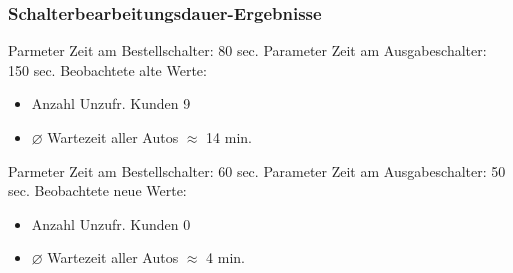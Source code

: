 \documentclass{beamer}
\begin{document}
\begin{frame}

\frametitle{Schalterbearbeitungsdauer-Ergebnisse}
	
	
	Parmeter Zeit am Bestellschalter: 80 sec. \newline
	Parameter Zeit am Ausgabeschalter: 150 sec. \newline
	Beobachtete alte Werte:\newline
	
  	\begin{itemize}
  		\item Anzahl Unzufr. Kunden 9
  		\item $\diameter$ Wartezeit aller Autos $\approx$ 14 min.
  	
  	\end{itemize}

	
	Parmeter Zeit am Bestellschalter: 60 sec. \newline
	Parameter Zeit am Ausgabeschalter: 50 sec. \newline
	Beobachtete neue Werte: \newline
		\begin{itemize}
  		\item Anzahl Unzufr. Kunden 0
  		\item $\diameter$ Wartezeit aller Autos $\approx$ 4 min.
  		
  	\end{itemize}

\end{frame}
\end{document}
